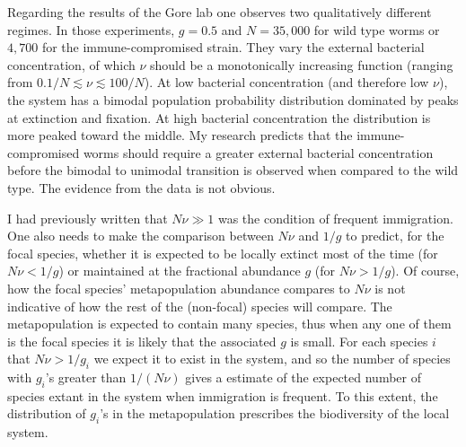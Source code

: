Regarding the results of the Gore lab \cite{Vega2017} one observes two qualitatively different regimes. 
In those experiments, $g=0.5$ and $N=35,000$ for wild type worms or $4,700$ for the immune-compromised strain. 
They vary the external bacterial concentration, of which $\nu$ should be a monotonically increasing function (ranging from $0.1/N \lesssim \nu \lesssim 100/N$). 
At low bacterial concentration (and therefore low $\nu$), the system has a bimodal population probability distribution dominated by peaks at extinction and fixation. 
At high bacterial concentration the distribution is more peaked toward the middle. %
My research predicts that the immune-compromised worms should require a greater external bacterial concentration before the bimodal to unimodal transition is observed when compared to the wild type. 
The evidence from the data is not obvious. 

I had previously written that $N\nu \gg 1$ was the condition of frequent immigration. 
One also needs to make the comparison between $N\nu$ and $1/g$ to predict, for the focal species, whether it is expected to be locally extinct most of the time (for $N\nu<1/g$) or maintained at the fractional abundance $g$ (for $N\nu>1/g$). 
Of course, how the focal species' metapopulation abundance compares to $N\nu$ is not indicative of how the rest of the (non-focal) species will compare. 
The metapopulation is expected to contain many species, thus when any one of them is the focal species it is likely that the associated $g$ is small. 
For each species $i$ that $N\nu>1/g_i$ we expect it to exist in the system, and so the number of species with $g_i$'s greater than $1/(N\nu)$ gives a estimate of the expected number of species extant in the system when immigration is frequent. 
To this extent, the distribution of $g_i$'s in the metapopulation prescribes the biodiversity of the local system. 


